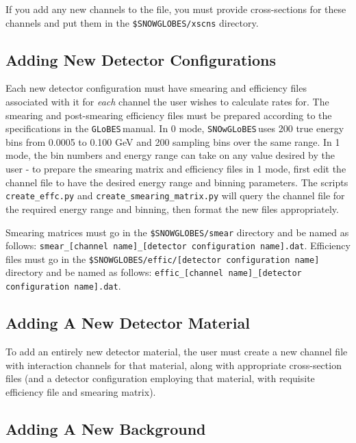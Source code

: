 \documentclass{article}
\newcommand{\snow}{\texttt{SNOwGLoBES}\,}
\newcommand{\glb}{\texttt{GLoBES}\,}
\begin{document}
If you add any new channels to the file, you must provide cross-sections for these channels and put them in the \texttt{\$SNOWGLOBES/xscns} directory.

\subsection{Adding New Detector Configurations}

Each new detector configuration must have smearing and efficiency files associated with it for \textit{each} channel the user wishes to calculate rates for. The smearing and post-smearing efficiency files must be prepared according to the specifications in the \glb manual. In 0 mode, \snow uses 200 true energy bins from 0.0005 to 0.100 GeV and 200 sampling bins over the same range. In 1 mode, the bin numbers and energy range can take on any value desired by the user - to prepare the smearing matrix and efficiency files in 1 mode, first edit the channel file to have the desired energy range and binning parameters. The scripts \texttt{create\_effc.py} and \texttt{create\_smearing\_matrix.py} will query the channel file for the required energy range and binning, then format the new files appropriately.

Smearing matrices must go in the \texttt{\$SNOWGLOBES/smear} directory and be named as follows: \texttt{smear\_[channel name]\_[detector configuration name].dat}. Efficiency files must go in the \texttt{\$SNOWGLOBES/effic/[detector configuration name]} directory and be named as follows: \texttt{effic\_[channel name]\_[detector configuration name].dat}.

\subsection{Adding A New Detector Material}

To add an entirely new detector material, the user must create a new channel file with interaction channels for that material, along with appropriate cross-section files (and a detector configuration employing that material, with requisite efficiency file and smearing matrix).

\subsection{Adding A New Background}
\end{document}
